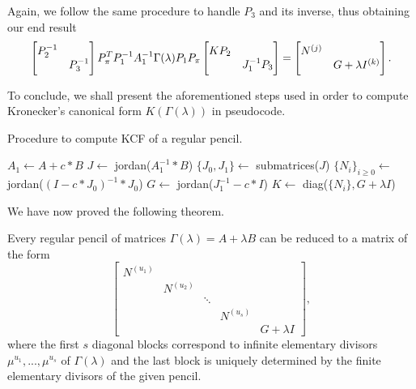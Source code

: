 Again, we follow the same procedure to handle \(P_{3}\) and its inverse, thus obtaining our end result
\begin{gather}
    \scalemath{0.975}{
        \begin{bmatrix}
            P_{2}^{-1} & \\
            & P_{3}^{-1}
        \end{bmatrix}
        P_{\pi}^T P_{1}^{-1} A_{1}^{-1} \Gamma(\lambda) P_{1} P_{\pi}
        \begin{bmatrix}
            KP_{2} & \\
            & J_{1}^{-1}P_{3}
        \end{bmatrix} =
        \begin{bmatrix}
            N^{(j)} & \\
            & G + \lambda I^{(k)}
        \end{bmatrix}. \label{gamma-reg}
    }
\end{gather}

To conclude, we shall present the aforementioned steps used in order to compute Kronecker's canonical form
\(K(\Gamma(\lambda))\) in pseudocode.
\begin{algorithm}
    \caption{Procedure to compute KCF of a regular pencil.}\label{alg:kcf-regular}
    $A_{1} \gets A + c*B$\;
    $J \gets $ jordan($A_{1}^{-1}*B$)\;
    $\{J_{0}, J_{1}\} \gets$ submatrices($J$)\;
    $\{N_{i}\}_{i \geq 0} \gets $ jordan($(I - c*J_{0})^{-1} * J_{0}$)\;
    $G \gets $ jordan($J_{1}^{-1} - c*I$)\;
    $K \gets $ diag($\{N_{i}\}, G +\lambda I$)\;
    \;
\end{algorithm}

We have now proved the following theorem.
\begin{theorem}
    Every regular pencil of matrices \(\Gamma(\lambda) = A + \lambda B\) can be reduced to a matrix of the form
    \[
        \begin{bmatrix}
            N^{(u_{1})} \\
            & N^{(u_{2})} \\
            & & \ddots \\
            & & & N^{(u_{s})} \\
            & & & & G + \lambda I
        \end{bmatrix},
    \]
    where the first \(s\) diagonal blocks correspond to infinite elementary divisors
    \(\mu^{u_{1}}, ..., \mu^{u_{s}}\) of \(\Gamma(\lambda)\) and the last block is uniquely determined by the
    finite elementary divisors of the given pencil.
\end{theorem}

